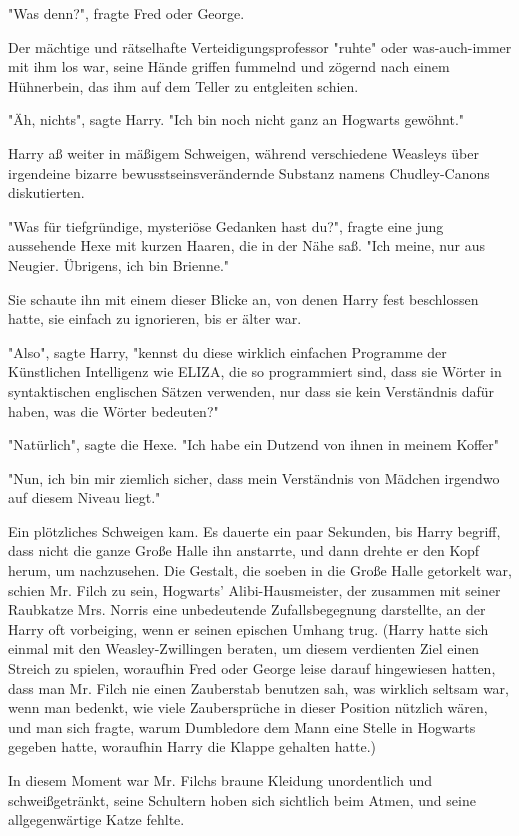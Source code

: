 {"Was denn?", fragte Fred oder George.

Der mächtige und rätselhafte Verteidigungsprofessor "ruhte" oder was-auch-immer mit ihm los war, seine Hände griffen fummelnd und zögernd nach einem Hühnerbein, das ihm auf dem Teller zu entgleiten schien.

"Äh, nichts", sagte Harry. "Ich bin noch nicht ganz an Hogwarts gewöhnt."

Harry aß weiter in mäßigem Schweigen, während verschiedene Weasleys über irgendeine bizarre bewusstseinsverändernde Substanz namens Chudley-Canons diskutierten.

"Was für tiefgründige, mysteriöse Gedanken hast du?", fragte eine jung aussehende Hexe mit kurzen Haaren, die in der Nähe saß. "Ich meine, nur aus Neugier. Übrigens, ich bin Brienne."

Sie schaute ihn mit einem dieser Blicke an, von denen Harry fest beschlossen hatte, sie einfach zu ignorieren, bis er älter war.

"Also", sagte Harry, "kennst du diese wirklich einfachen Programme der Künstlichen Intelligenz wie ELIZA, die so programmiert sind, dass sie Wörter in syntaktischen englischen Sätzen verwenden, nur dass sie kein Verständnis dafür haben, was die Wörter bedeuten?"

"Natürlich", sagte die Hexe. "Ich habe ein Dutzend von ihnen in meinem Koffer"

"Nun, ich bin mir ziemlich sicher, dass mein Verständnis von Mädchen irgendwo auf diesem Niveau liegt."

Ein plötzliches Schweigen kam. Es dauerte ein paar Sekunden, bis Harry begriff, dass nicht die ganze Große Halle ihn anstarrte, und dann drehte er den Kopf herum, um nachzusehen. Die Gestalt, die soeben in die Große Halle getorkelt war, schien Mr. Filch zu sein, Hogwarts' Alibi-Hausmeister, der zusammen mit seiner Raubkatze Mrs. Norris eine unbedeutende Zufallsbegegnung darstellte, an der Harry oft vorbeiging, wenn er seinen epischen Umhang trug. (Harry hatte sich einmal mit den Weasley-Zwillingen beraten, um diesem verdienten Ziel einen Streich zu spielen, woraufhin Fred oder George leise darauf hingewiesen hatten, dass man Mr. Filch nie einen Zauberstab benutzen sah, was wirklich seltsam war, wenn man bedenkt, wie viele Zaubersprüche in dieser Position nützlich wären, und man sich fragte, warum Dumbledore dem Mann eine Stelle in Hogwarts gegeben hatte, woraufhin Harry die Klappe gehalten hatte.)

In diesem Moment war Mr. Filchs braune Kleidung unordentlich und schweißgetränkt, seine Schultern hoben sich sichtlich beim Atmen, und seine allgegenwärtige Katze fehlte.

}
